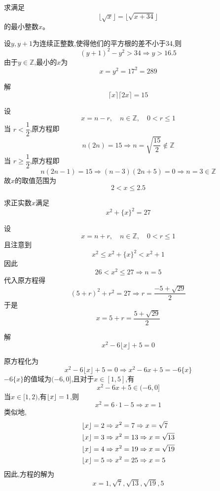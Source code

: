 \begin{questions}
    \question 求满足
    \[
    \lfloor \sqrt{x}\rfloor=\lfloor \sqrt{x+34}\rfloor
    \]
    的最小整数$x$。
    \begin{solution}
        设$y,y+1$为连续正整数,使得他们的平方根的差不小于34,则
        \[
        (y+1)^2-y^2>34 \Rightarrow y>16.5
        \]
        由于$y \in \mathbb{Z}$,最小的$x$为
        \[
        x=y^2=17^2=289
        \]
    \end{solution}

    \question 解
    \[
    \lceil x\rceil \lceil 2x\rceil = 15
    \]
    \begin{solution}
        设
        \[
        x=n-r, \quad n \in \mathbb{Z}, \quad 0<r\le 1
        \]
        当 $r < \dfrac{1}{2}$,原方程即
        \[
        n(2n) = 15 \Rightarrow n = \sqrt{\frac{15}{2}} \not \in \mathbb{Z}
        \]
        当  $r \ge \dfrac{1}{2}$,原方程即
        \[
        n(2n-1) = 15 \Rightarrow (n-3)(2n+5) = 0 \Rightarrow n = 3 \in \mathbb{Z}
        \]
        故$x$的取值范围为
        \[
        2 < x \le 2.5
        \]
    \end{solution}

    \question 求正实数$x$满足
    \[
    x^2+\{x\}^2=27
    \]
    \begin{solution}
        设
        \[
        x=n+r, \quad n \in \mathbb{Z}, \quad 0<r\le 1
        \]
        且注意到
        \[
        x^2 \le x^2+\{x\}^2 < x^2+1
        \]
        因此
        \[
        26<x^2\le27 \Rightarrow n=5
        \]
        代入原方程得
        \[
        (5+r)^2+r^2=27 \Rightarrow r=\frac{-5+\sqrt{29}}{2}
        \]
        于是
        \[
        x=5+r=\frac{5+\sqrt{29}}{2}
        \]
    \end{solution}

    \question 解
    \[
    x^2 - 6\lfloor x \rfloor + 5 = 0
    \]
    \begin{solution}
        原方程化为
        \[
        x^2 - 6\lfloor x \rfloor + 5 = 0 \Rightarrow x^2 - 6x + 5 = -6 \{x\}
        \]
        $-6 \{x\}$的值域为$(-6,0]$,且对于$x \in [1,5]$,有
        \[
        x^2 - 6x + 5 \in (-6,0]
        \]
        当$x \in [1,2)$,有$\lfloor x\rfloor=1$,则
        \[
        x^2=6\cdot1-5 \Rightarrow x=1
        \]
        类似地,
        \begin{align}
        \lfloor x\rfloor&=2 \Rightarrow x^2 = 7 \Rightarrow x = \sqrt{7} \\
        \lfloor x\rfloor&=3 \Rightarrow x^2 = 13 \Rightarrow x = \sqrt{13} \\
        \lfloor x\rfloor&=4 \Rightarrow x^2 = 19 \Rightarrow x = \sqrt{19} \\
        \lfloor x\rfloor&=5 \Rightarrow x^2 = 25 \Rightarrow x = 5 
        \end{align}
        因此,方程的解为
        \[
        x = 1, \sqrt{7}, \sqrt{13}, \sqrt{19}, 5
        \]
    \end{solution}


\end{questions}
